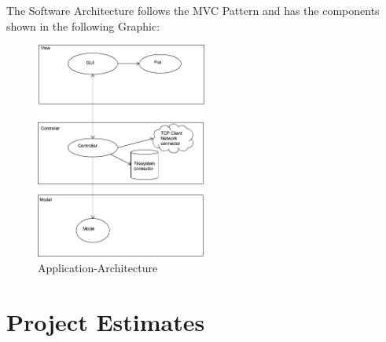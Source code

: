 \documentclass[
	11pt,
	a4paper
]{article}%
\begin{document}
\\\\
The Software Architecture follows the MVC Pattern and has the components shown in the following Graphic:
\begin{figure}[h!]
  \caption{Application-Architecture}
  \centering
    \includegraphics[width=0.50\textwidth]{../Images/application_architecture.png}
\end{figure}


\newpage
\section{Project Estimates}
\end{document}
